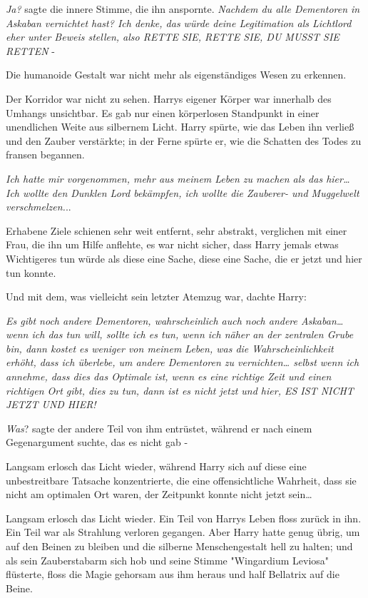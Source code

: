 {\emph{Ja?} sagte die innere Stimme, die ihn anspornte. \emph{Nachdem du alle Dementoren in Askaban vernichtet hast? Ich denke, das würde deine Legitimation als Lichtlord eher unter Beweis stellen, also RETTE SIE, RETTE SIE, DU MUSST SIE RETTEN} -

Die humanoide Gestalt war nicht mehr als eigenständiges Wesen zu erkennen.

Der Korridor war nicht zu sehen. Harrys eigener Körper war innerhalb des Umhangs unsichtbar. Es gab nur einen körperlosen Standpunkt in einer unendlichen Weite aus silbernem Licht. Harry spürte, wie das Leben ihn verließ und den Zauber verstärkte; in der Ferne spürte er, wie die Schatten des Todes zu fransen begannen.

\emph{Ich hatte mir vorgenommen, mehr aus meinem Leben zu machen als das hier… Ich wollte den Dunklen Lord bekämpfen, ich wollte die Zauberer- und Muggelwelt verschmelzen.}..

Erhabene Ziele schienen sehr weit entfernt, sehr abstrakt, verglichen mit einer Frau, die ihn um Hilfe anflehte, es war nicht sicher, dass Harry jemals etwas Wichtigeres tun würde als diese eine Sache, diese eine Sache, die er jetzt und hier tun konnte.

Und mit dem, was vielleicht sein letzter Atemzug war, dachte Harry:

\emph{Es gibt noch andere Dementoren, wahrscheinlich auch noch andere Askaban… wenn ich das tun will, sollte ich es tun, wenn ich näher an der zentralen Grube bin, dann kostet es weniger von meinem Leben, was die Wahrscheinlichkeit erhöht, dass ich überlebe, um andere Dementoren zu vernichten… selbst wenn ich annehme, dass dies das Optimale ist, wenn es eine richtige Zeit und einen richtigen Ort gibt, dies zu tun, dann ist es nicht jetzt und hier, ES IST NICHT JETZT UND HIER!}

\emph{Was}? sagte der andere Teil von ihm entrüstet, während er nach einem Gegenargument suchte, das es nicht gab -

Langsam erlosch das Licht wieder, während Harry sich auf diese eine unbestreitbare Tatsache konzentrierte, die eine offensichtliche Wahrheit, dass sie nicht am optimalen Ort waren, der Zeitpunkt konnte nicht jetzt sein…

Langsam erlosch das Licht wieder. Ein Teil von Harrys Leben floss zurück in ihn. Ein Teil war als Strahlung verloren gegangen. Aber Harry hatte genug übrig, um auf den Beinen zu bleiben und die silberne Menschengestalt hell zu halten; und als sein Zauberstabarm sich hob und seine Stimme "Wingardium Leviosa" flüsterte, floss die Magie gehorsam aus ihm heraus und half Bellatrix auf die Beine.

}
